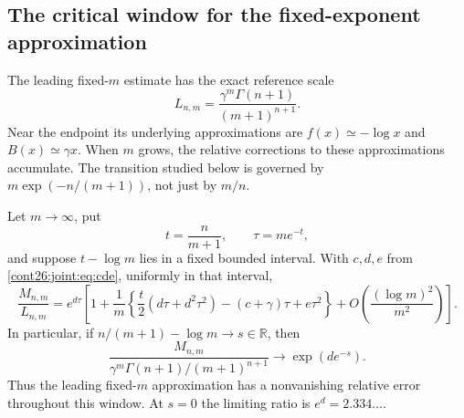 \subsection{The critical window for the fixed-exponent approximation}

The leading fixed-$m$ estimate has the exact reference scale
\begin{equation}\label{cont26:joint:eq:reference}
 L_{n,m}=\frac{\gamma^m\Gamma(n+1)}{(m+1)^{n+1}}.
\end{equation}
Near the endpoint its underlying approximations are
$f(x)\simeq-\log x$ and $B(x)\simeq\gamma x$.
When $m$ grows, the relative corrections to these approximations
accumulate.  The transition studied below is governed by
$m\exp(-n/(m+1))$, not just by $m/n$.

\begin{theorem}
\label{cont26:joint:thm:critical}
Let $m\to\infty$, put
\[
 t=\frac n{m+1},\qquad \tau=m e^{-t},
\]
and suppose $t-\log m$ lies in a fixed bounded interval.
With $c,d,e$ from \eqref{cont26:joint:eq:cde}, uniformly in that interval,
\begin{equation}\label{cont26:joint:eq:critical}
 \frac{M_{n,m}}{L_{n,m}}
 =e^{d\tau}\left[
 1+\frac1m\left\{
 \frac t2(d\tau+d^2\tau^2)-(c+\gamma)\tau+e\tau^2
 \right\}
 +O\left(\frac{(\log m)^2}{m^2}\right)\right].
\end{equation}
In particular, if $n/(m+1)-\log m\to s\in\mathbb R$, then
\begin{equation}\label{cont26:joint:eq:critical-limit}
 \frac{M_{n,m}}{\gamma^m\Gamma(n+1)/(m+1)^{n+1}}
 \longrightarrow \exp(d e^{-s}).
\end{equation}
Thus the leading fixed-$m$ approximation has a nonvanishing relative
error throughout this window.  At $s=0$ the limiting ratio is
$e^d=2.334\ldots$.
\end{theorem}

